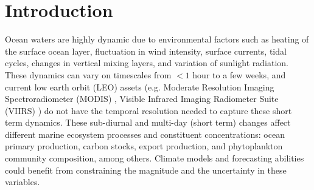 \documentclass[remotesensing,article,submit,moreauthors,pdftex,10pt,a4paper]{Definitions/mdpi}
\begin{document}


\section{Introduction}




Ocean waters are highly dynamic due to environmental factors such as heating of the surface ocean layer, fluctuation in wind intensity, surface currents, tidal cycles, changes in vertical mixing layers, and variation of sunlight radiation. These dynamics can vary on timescales from $< 1$ hour to a few weeks, and current low earth orbit (LEO) assets (e.g. Moderate Resolution Imaging Spectroradiometer (MODIS) \cite{Esaias1998}, Visible Infrared Imaging Radiometer Suite (VIIRS) \cite{Goldberg_2013}) do not have the temporal resolution needed to capture these short term dynamics. These sub-diurnal and multi-day (short term) changes affect different marine ecosystem processes and constituent concentrations: ocean primary production, carbon stocks, export production, and phytoplankton community composition, among others. Climate models and forecasting abilities could benefit from constraining the magnitude and the uncertainty in these variables. 

\end{document}
